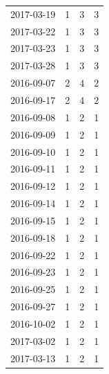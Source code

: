 \begin{tabular}{lrrr}
2017-03-19 & 1 & 3 & 3 \\
2017-03-22 & 1 & 3 & 3 \\
2017-03-23 & 1 & 3 & 3 \\
2017-03-28 & 1 & 3 & 3 \\
2016-09-07 & 2 & 4 & 2 \\
2016-09-17 & 2 & 4 & 2 \\
2016-09-08 & 1 & 2 & 1 \\
2016-09-09 & 1 & 2 & 1 \\
2016-09-10 & 1 & 2 & 1 \\
2016-09-11 & 1 & 2 & 1 \\
2016-09-12 & 1 & 2 & 1 \\
2016-09-14 & 1 & 2 & 1 \\
2016-09-15 & 1 & 2 & 1 \\
2016-09-18 & 1 & 2 & 1 \\
2016-09-22 & 1 & 2 & 1 \\
2016-09-23 & 1 & 2 & 1 \\
2016-09-25 & 1 & 2 & 1 \\
2016-09-27 & 1 & 2 & 1 \\
2016-10-02 & 1 & 2 & 1 \\
2017-03-02 & 1 & 2 & 1 \\
2017-03-13 & 1 & 2 & 1 \\
\bottomrule
\end{tabular}
